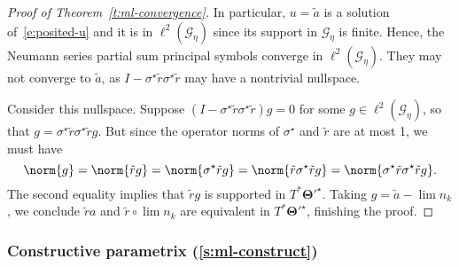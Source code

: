 \documentclass[10pt]{article}
\theoremstyle{plain}
\theoremstyle{definition}
\theoremstyle{remark}
\numberwithin{theorem}{section}
\numberwithin{example}{section}
\numberwithin{equation}{section}
\numberwithin{figure}{section}
\newcommand\sref[1]{\textsection\ref{#1}}					%
\newcommand\bTheta{\boldsymbol\Theta}
\begin{document}
\begin{proof}[Proof of Theorem~\ref{t:ml-convergence}]
	In particular, $u=\tilde a$ is a solution of~\eqref{e:posited-u} and it is in $\ell^2(\mathcal G_\eta)$ since its support in $\mathcal G_\eta$ is finite. Hence, the Neumann series partial sum principal symbols converge in $\ell^2(\mathcal G_\eta)$. They may not converge to $\tilde a$, as $I-\sigma^\star \tilde r\sigma^\star \tilde r$ may have a nontrivial nullspace.

	Consider this nullspace. Suppose $(I-\sigma^\star\tilde r\sigma^\star\tilde r)g=0$ for some $g\in\ell^2(\mathcal G_\eta)$, so that $g = \sigma^\star\tilde r\sigma^\star\tilde r g$. But since the operator norms of $\sigma^\star$ and $\tilde r$ are at most 1, we must have 
	\begin{equation}
		\norm{g} = \norm{\tilde r g} = \norm{\sigma^\star\tilde r g} = \norm{\tilde r\sigma^\star \tilde r g} = \norm{\sigma^\star\tilde r\sigma^\star\tilde rg}. 
	\end{equation}
	The second equality implies that $\tilde r g$ is supported in $T^*\bTheta'^\star$. Taking $g=\tilde a-\lim n_k$, we conclude $\tilde r a$ and $\tilde r\circ \lim n_k$ are equivalent in $T^*\bTheta'^\star$, finishing the proof.
\end{proof}




\subsubsection{Constructive parametrix (\sref{s:ml-construct})}       \label{s:ml-construct-proof}
\end{document}
